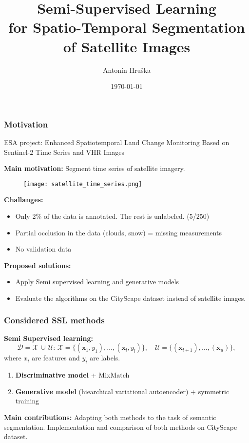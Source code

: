 \documentclass[aspectratio=169]{beamer}
\title{Semi-Supervised Learning \\for Spatio-Temporal Segmentation of Satellite Images}
\author{Antonín Hruška}
\date{\today}
\begin{document}
\maketitle

\begin{frame}
    \frametitle{Motivation}
    ESA project: Enhanced Spatiotemporal Land Change Monitoring Based on Sentinel-2 Time Series and VHR Images

    \textbf{Main motivation:}  Segment time series of satellite imagery.
    \begin{figure}[b]
        \centering
        \texttt{[image: satellite\_time\_series.png]}
    \end{figure}  
    
    {\footnotesize\textbf{Challanges:}    
    \begin{itemize}
        \item Only 2\% of the data is annotated. The rest is unlabeled. (5/250) 
        \item Partial occlusion in the data (clouds, snow) = missing measurements 
        \item No validation data 
    \end{itemize}
    \textbf{Proposed solutions:}
    \begin{itemize}
        \item Apply Semi supervised learning and generative models 
        \item Evaluate the algorithms on the CityScape dataset instead of satellite images. 
    \end{itemize}}
\end{frame}

\begin{frame}
    \frametitle{Considered SSL methods}
    \textbf{Semi Supervised learning:}
    $$
    \mathcal{D} = \mathcal{X}\,\cup\,\mathcal{U}:\, \mathcal{X} = \{(\mathbf{x}_1,y_1),\dots, (\mathbf{x}_l,y_l)\},\quad \mathcal{U} = \{(\mathbf{x}_{l+1}),\dots,(\mathbf{x}_{u})\},
    $$
    where $x_i$ are features and $y_i$ are labels. 
    \begin{enumerate}
        \item \textbf{Discriminative model} + MixMatch 
        \item \textbf{Generative model} (hiearchical variational autoencoder) + symmetric training
    \end{enumerate}
    
    \textbf{Main contributions:} Adapting both methods to the task of semantic segmentation. Implementation and comparison of both methods on CityScape dataset.

\end{frame}
\end{document}
